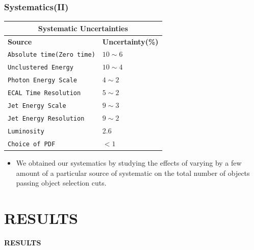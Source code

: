 \documentclass{beamer}
\begin{document}
\begin{frame}
\frametitle{ Systematics(II)}
\begin{minipage}[t]{0.8\textwidth}
\centering
\begin{tabular}{l l}
  \multicolumn{2}{c}{\bfseries{Systematic Uncertainties}} \\
  \hline 
   \bfseries{Source} & \bfseries{Uncertainty(\%)} \\
   \hline
   \texttt{Absolute time(Zero time)}& $10\sim 6$  \\
   \texttt{Unclustered Energy}&  $10 \sim 4 $  \\
   \texttt{Photon Energy Scale}& $ 4 \sim 2$  \\
   \texttt{ECAL Time Resolution}& $ 5 \sim 2 $   \\
   \texttt{Jet Energy Scale}& $9 \sim 3$   \\
   \texttt{Jet Energy Resolution}& $ 9 \sim 2 $  \\
   \hline
   \texttt{Luminosity} & 2.6    \\
   \texttt{Choice of PDF} & $ < 1$ \\
  \hline \hline
 \end{tabular} 
 \end{minipage}
 
 \begin{minipage}[b]{0.8\textwidth}
 \begin{itemize}
  \item We obtained our systematics by studying the effects of varying by a few amount of a particular source of systematic on the total number of objects passing object selection cuts.
   \end{itemize}
 \end{minipage}
\end{frame}




\section{RESULTS}
{
\begin{frame}
  \begin{center}
   \textcolor{UMN@Maroon}{\Huge{\textbf{RESULTS}}}
  \end{center}
\end{frame}
}
\end{document}
